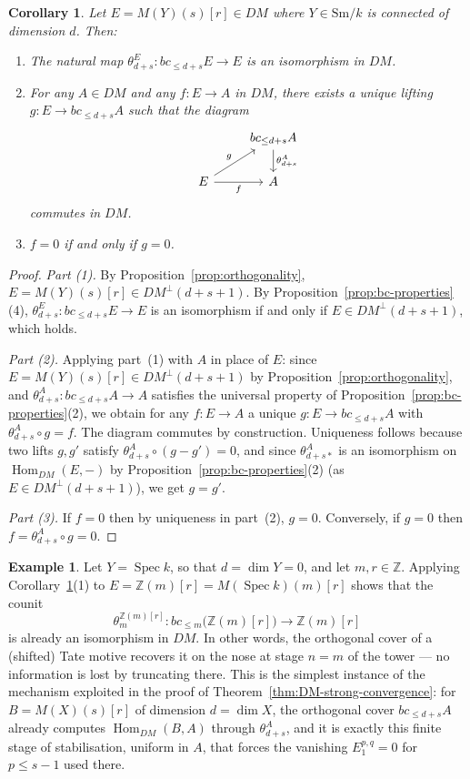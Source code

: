 \documentclass[12pt,a4paper]{article}
\newtheorem{corollary}[theorem]{Corollary}
\theoremstyle{definition}
\newtheorem{example}[theorem]{Example}
\newcommand{\Sm}{\mathrm{Sm}}
\newcommand{\Hom}{\operatorname{Hom}}
\newcommand{\Z}{\mathbb{Z}}
\begin{document}
\begin{corollary}\label{cor:bc-isomorphism}
Let $E=M(Y)(s)[r]\in DM$ where $Y\in\Sm/k$ is connected of dimension $d$.  Then:
\begin{enumerate}
  \item The natural map $\theta_{d+s}^E:bc_{\leq d+s}E\to E$ is an isomorphism in
    $DM$.
  \item For any $A\in DM$ and any $f:E\to A$ in $DM$, there exists a unique lifting
    $g:E\to bc_{\leq d+s}A$ such that the diagram
    \[
    \begin{tikzcd}
      & bc_{\leq d+s}A \ar[d,"\theta_{d+s}^A"]\\
      E \ar[ur,"g"] \ar[r,"f"'] & A
    \end{tikzcd}
    \]
    commutes in $DM$.
  \item $f=0$ if and only if $g=0$.
\end{enumerate}
\end{corollary}
\begin{proof}
\textit{Part (1).}  By Proposition~\ref{prop:orthogonality},
$E=M(Y)(s)[r]\in DM^\perp(d+s+1)$.  By Proposition~\ref{prop:bc-properties}(4),
$\theta_{d+s}^E:bc_{\leq d+s}E\to E$ is an isomorphism if and only if
$E\in DM^\perp(d+s+1)$, which holds.

\textit{Part (2).}  Applying part~(1) with $A$ in place of $E$: since
$E=M(Y)(s)[r]\in DM^\perp(d+s+1)$ by Proposition~\ref{prop:orthogonality}, and
$\theta_{d+s}^A:bc_{\leq d+s}A\to A$ satisfies the universal property of
Proposition~\ref{prop:bc-properties}(2), we obtain for any $f:E\to A$ a unique
$g:E\to bc_{\leq d+s}A$ with $\theta_{d+s}^A\circ g = f$.  The diagram commutes
by construction.  Uniqueness follows because two lifts $g,g'$ satisfy
$\theta_{d+s}^A\circ(g-g')=0$, and since $\theta_{d+s*}^A$ is an isomorphism on
$\Hom_{DM}(E,-)$ by Proposition~\ref{prop:bc-properties}(2) (as $E\in DM^\perp(d+s+1)$),
we get $g=g'$.

\textit{Part (3).}  If $f=0$ then by uniqueness in part~(2), $g=0$.  Conversely,
if $g=0$ then $f=\theta_{d+s}^A\circ g=0$.
\end{proof}

\begin{example}\label{ex:bc-Tate}
Let $Y=\operatorname{Spec}k$, so that $d=\dim Y=0$, and let $m,r\in\Z$.  Applying
Corollary~\ref{cor:bc-isomorphism}(1) to $E=\Z(m)[r]=M(\operatorname{Spec}k)(m)[r]$
shows that the counit
\[
  \theta_m^{\Z(m)[r]}:bc_{\leq m}\bigl(\Z(m)[r]\bigr)\longrightarrow\Z(m)[r]
\]
is already an isomorphism in $DM$.  In other words, the orthogonal cover of a
(shifted) Tate motive recovers it on the nose at stage $n=m$ of the tower — no
information is lost by truncating there.  This is the simplest instance of the
mechanism exploited in the proof of Theorem~\ref{thm:DM-strong-convergence}: for
$B=M(X)(s)[r]$ of dimension $d=\dim X$, the orthogonal cover $bc_{\leq d+s}A$
already computes $\Hom_{DM}(B,A)$ through $\theta_{d+s}^A$, and it is exactly this
finite stage of stabilisation, uniform in $A$, that forces the vanishing
$E_1^{p,q}=0$ for $p\leq s-1$ used there.
\end{example}
\end{document}
